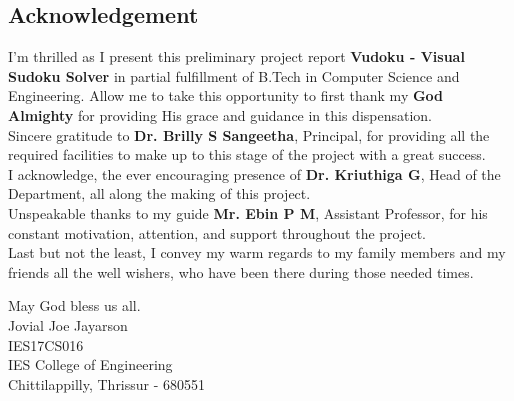 \documentclass[12pt, a4paper]{report}
\begin{document}
\newpage
\vspace*{\fill}
\begin{center}
    \section*{Acknowledgement}
\end{center}

\noindent I'm thrilled as I present this preliminary project report \textbf{Vudoku - Visual Sudoku Solver} in partial fulfillment of B.Tech in Computer Science and Engineering. Allow me to take this opportunity to first thank my \textbf{God Almighty} for providing His grace and guidance in this dispensation.\\

\noindent Sincere gratitude to \textbf{Dr. Brilly S Sangeetha}, Principal, for providing all the required facilities to make up to this stage of the project with a great success.\\

\noindent I acknowledge, the ever encouraging presence of \textbf{Dr. Kriuthiga G}, Head of the Department, all along the making of this project.\\

\noindent Unspeakable thanks to my guide \textbf{Mr. Ebin P M}, Assistant Professor, for his constant motivation, attention, and support throughout the project.\\

\noindent Last but not the least, I convey my warm regards to my family members and my friends all the well wishers, who have been there during those needed times.\\

\begin{center}
    May God bless us all.\\[5cm]
    Jovial Joe Jayarson\\
    IES17CS016\\
    IES College of Engineering\\
    Chittilappilly, Thrissur - 680551
\end{center}
\vspace*{\fill}
\end{document}

